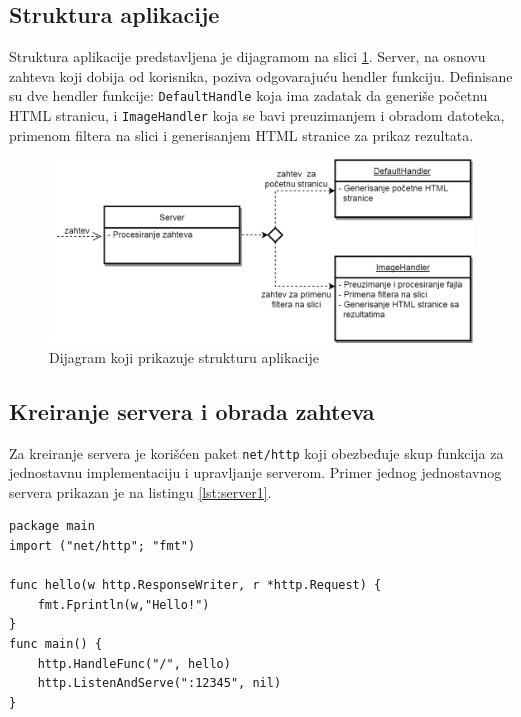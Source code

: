 \documentclass[12pt,oneside]{memoir}
\begin{document}
\subsection{Struktura aplikacije}
Struktura aplikacije predstavljena je dijagramom na slici \ref{fig:diag}. Server, na osnovu zahteva koji dobija od korisnika, poziva odgovarajuću hendler funkciju. Definisane su dve hendler funkcije: \texttt{DefaultHandle} koja ima zadatak da generiše početnu HTML stranicu, i \texttt{ImageHandler} koja se bavi preuzimanjem i obradom datoteka, primenom filtera na slici i generisanjem HTML stranice za prikaz rezultata. 
 
\begin{figure}
\begin{center}
\includegraphics[scale=0.45]{dijagram.png}
\end{center}
\caption{Dijagram koji prikazuje strukturu aplikacije}
\label{fig:diag}
\end{figure}

\subsection{Kreiranje servera i obrada zahteva}

Za kreiranje servera je korišćen paket \texttt{net/http} koji obezbeđuje skup funkcija za jednostavnu implementaciju i upravljanje serverom. Primer jednog jednostavnog servera prikazan je na listingu \ref{lst:server1}. 

\begin{center}
\begin{lstlisting}[caption=Primer jednostavnog servera,label={lst:server1},   backgroundcolor=\color{background}]
package main
import ("net/http"; "fmt")

func hello(w http.ResponseWriter, r *http.Request) {
	fmt.Fprintln(w,"Hello!")
}
func main() {
	http.HandleFunc("/", hello)
	http.ListenAndServe(":12345", nil)
}
\end{lstlisting}
\end{center}
\end{document}
